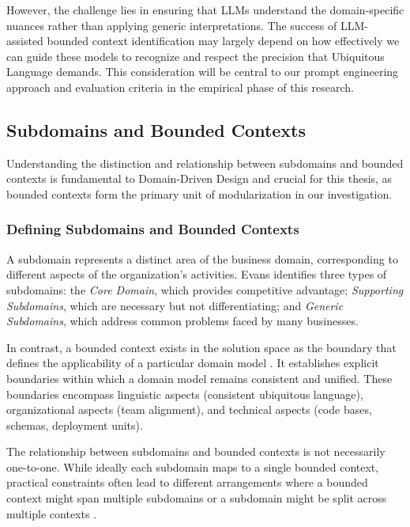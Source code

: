 However, the challenge lies in ensuring that LLMs understand the domain-specific nuances rather than applying generic interpretations. The success of LLM-assisted bounded context identification may largely depend on how effectively we can guide these models to recognize and respect the precision that Ubiquitous Language demands. This consideration will be central to our prompt engineering approach and evaluation criteria in the empirical phase of this research.

\subsection{Subdomains and Bounded Contexts}
Understanding the distinction and relationship between subdomains and bounded contexts is fundamental to Domain-Driven Design and crucial for this thesis, as bounded contexts form the primary unit of modularization in our investigation.

\subsubsection{Defining Subdomains and Bounded Contexts}

A subdomain represents a distinct area of the business domain, corresponding to different aspects of the organization's activities. Evans \autocite{Evans2003} identifies three types of subdomains: the \textit{Core Domain}, which provides competitive advantage; \textit{Supporting Subdomains}, which are necessary but not differentiating; and \textit{Generic Subdomains}, which address common problems faced by many businesses.

In contrast, a bounded context exists in the solution space as the boundary that defines the applicability of a particular domain model \autocite{Evans2003}. It establishes explicit boundaries within which a domain model remains consistent and unified. These boundaries encompass linguistic aspects (consistent ubiquitous language), organizational aspects (team alignment), and technical aspects (code bases, schemas, deployment units).

The relationship between subdomains and bounded contexts is not necessarily one-to-one. While ideally each subdomain maps to a single bounded context, practical constraints often lead to different arrangements where a bounded context might span multiple subdomains or a subdomain might be split across multiple contexts \autocite{Evans2003}.

